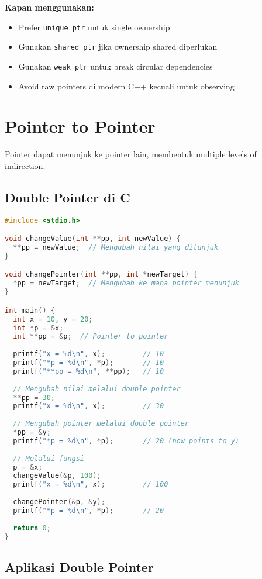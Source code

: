 \documentclass[../main.tex]{subfiles}
\begin{document}
\textbf{Kapan menggunakan:}
\begin{itemize}
  \item Prefer \texttt{unique\_ptr} untuk single ownership
  \item Gunakan \texttt{shared\_ptr} jika ownership shared diperlukan
  \item Gunakan \texttt{weak\_ptr} untuk break circular dependencies
  \item Avoid raw pointers di modern C++ kecuali untuk observing
\end{itemize}

\section{Pointer to Pointer}

Pointer dapat menunjuk ke pointer lain, membentuk multiple levels of indirection.

\subsection{Double Pointer di C}

\begin{lstlisting}[language=C, caption={Pointer to pointer di C}]
#include <stdio.h>

void changeValue(int **pp, int newValue) {
  **pp = newValue;  // Mengubah nilai yang ditunjuk
}

void changePointer(int **pp, int *newTarget) {
  *pp = newTarget;  // Mengubah ke mana pointer menunjuk
}

int main() {
  int x = 10, y = 20;
  int *p = &x;
  int **pp = &p;  // Pointer to pointer
  
  printf("x = %d\n", x);         // 10
  printf("*p = %d\n", *p);       // 10
  printf("**pp = %d\n", **pp);   // 10
  
  // Mengubah nilai melalui double pointer
  **pp = 30;
  printf("x = %d\n", x);         // 30
  
  // Mengubah pointer melalui double pointer
  *pp = &y;
  printf("*p = %d\n", *p);       // 20 (now points to y)
  
  // Melalui fungsi
  p = &x;
  changeValue(&p, 100);
  printf("x = %d\n", x);         // 100
  
  changePointer(&p, &y);
  printf("*p = %d\n", *p);       // 20
  
  return 0;
}
\end{lstlisting}

\subsection{Aplikasi Double Pointer}
\end{document}
